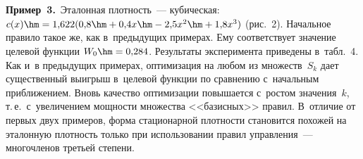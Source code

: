 \begin{multicols}{2}
\begin{figure*} %
\vspace*{1pt}
\begin{minipage}[t]{80mm}
 \begin{center}
 \mbox{%
 \epsfxsize=76.687mm 
 }
 \end{center}
\vspace*{-9pt}
\end{minipage}
\hfill
   \vspace*{1pt}
   \begin{minipage}[t]{80mm}
 \begin{center}
 \mbox{%
 \epsfxsize=76.687mm 
 }
 \end{center}
\vspace*{-9pt}
   \end{minipage}
   \end{figure*}
   
   
   
   \noindent
   \textbf{Пример~3.}\ Эталонная плот\-ность~--- кубическая: $c(x)\hm= 
1{,}622(0{,}8\hm+0{,}4x\hm- 2{,}5x^2\hm+ 1{,}8x^3)$ (рис.~2). 
Начальное правило такое же, как в~предыду\-щих примерах. Ему соответствует 
значение целевой функции $W_0\hm=0{,}284$. Результаты эксперимента 
приведены в~табл.~4. Как и~в предыду\-щих примерах, оптимизация на любом 
из множеств~$S_k$ дает существенный выигрыш в~целевой функции по 
сравнению с~начальным при\-бли\-же\-ни\-ем. Вновь качество оптимизации 
повышается с~ростом значения~$k$, т.\,е.\ с~увеличением мощ\-ности 
множества <<базисных>> правил. В~отличие от первых двух примеров, 
форма стационарной плот\-ности становится похожей на эталонную плотность 
только при использовании правил управ\-ле\-ния~--- многочленов третьей 
сте\-пени.

\begin{table*}\small %
\begin{center}
\vspace*{2ex}


\end{center}
\end{table*}
\end{multicols}
